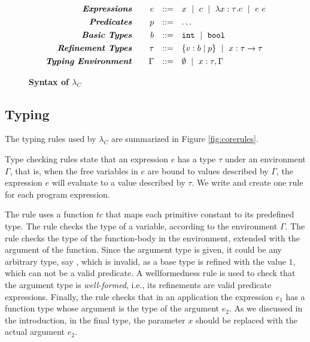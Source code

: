 \begin{figure}[t!]
\centering
$$
\begin{array}{rrcl}
\emphbf{Expressions} \quad 
  & e 
  & ::= 
  &      x 
  \spmid c 
  \spmid \efunt{x}{\tau}{e} 
  \spmid \eapp{e}{e} 
  \\[0.05in] 

\emphbf{Predicates} \quad 
  & p
  & ::= 
  & \dots
  \\[0.05in] 

\emphbf{Basic Types} \quad 
  & b 
  & ::= 
  &      \tbint
  \spmid \tbbool
  \\[0.05in]

\emphbf{Refinement Types} \quad 
  & \tau 
  & ::= 
  &      \tref{b}{p} 
  \spmid \tfun{x}{\tau}{\tau}
  \\[0.05in]

\emphbf{Typing Environment} \quad 
  & \Gamma 
  & ::= 
  &      \emptyset 
  \spmid x:\tau, \Gamma

\end{array}
$$
\caption{\textbf{Syntax of $\lambda_C$}}
\label{fig:coresyntax}
\end{figure}



\subsection{Typing}
The typing rules used by $\lambda_C$ are summarized in Figure \ref{fig:corerules}.

Type checking rules state that
an expression $e$ has a type $\tau$ under an environment $\Gamma$,
that is, when the free variables in $e$ are bound to values described by 
$\Gamma$, the expression $e$ will evaluate to a value described by $\tau$.
We write  and create one rule for each program expression.

The rule \tconst uses a function $tc$ that maps each primitive constant 
to its predefined type.
%
The rule \tvariable checks the type of a variable, according 
to the environment $\Gamma$.
%
The rule \tfunction checks the type of the function-body
in the environment, extended with the argument of the function.
Since the argument type is given, it could be any arbitrary type,
say ,
which is invalid, as a base type is refined with 
the value $1$, which can not be a valid predicate.
%
A wellformedness rule is used to 
check that the argument type is \textit{well-formed}, 
i.e., its refinements are valid predicate expressions.
%
Finally, the rule \tapp checks that in an application 
the expression $e_1$ has a function type
whose argument is the type of the argument $e_2$.
%
As we discussed in the introduction, in the final type,
the parameter $x$ should be replaced with the actual argument $e_2$.

